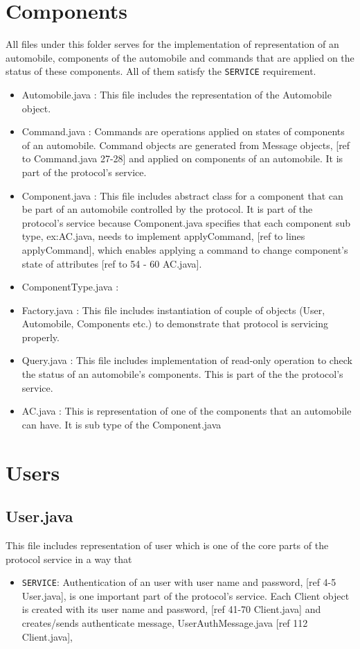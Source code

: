 \documentclass[12pt]{usenixsubmit}
\begin{document}
  \section{Components} All files under this folder serves for the implementation of representation of an automobile, components of the automobile and commands that are applied on the status of these components. All of them satisfy the {\tt SERVICE} requirement.
  \begin{itemize}
  \item Automobile.java : This file includes the representation of the Automobile object.
  \item Command.java : Commands are operations applied on states of components of an automobile. Command objects are generated from Message objects, [ref to Command.java 27-28] and applied on components of an automobile. It is part of the protocol's service.
  \item Component.java :  This file includes abstract class for a component that can be part of an automobile controlled by the protocol. It is part of the protocol's service because Component.java specifies that each component sub type, ex:AC.java, needs to implement \textsf{applyCommand}, [ref to lines applyCommand], which enables applying a command to change component's state of attributes [ref to 54 - 60 AC.java]. 
  \item ComponentType.java : 
  \item Factory.java : This file includes instantiation of couple of objects (User, Automobile, Components etc.) to demonstrate that protocol is servicing properly.
  \item Query.java : This file includes implementation of read-only operation to check the status of an automobile's components. This is part of the the protocol's service.
  \item AC.java : This is representation of one of the components that an automobile can have. It is sub type of the Component.java
  \end{itemize}
  
  \section{Users}
  \subsection{User.java} This file includes representation of user which is one of the core parts of the protocol service in a way that 
  \begin{itemize}
  \item {\tt SERVICE}: Authentication of an user with user name and password, [ref 4-5 User.java],  is one important part of the protocol's service. Each Client object is created with its user name and password, [ref 41-70 Client.java] and creates/sends authenticate message, UserAuthMessage.java [ref 112 Client.java], 
    \end{itemize}
  
\end{document}
